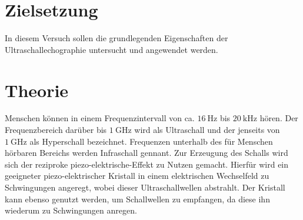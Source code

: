 \section{Zielsetzung}
\label{sec:Zielsetzung}

In diesem Versuch sollen die grundlegenden Eigenschaften der Ultraschallechographie untersucht und angewendet werden.

\section{Theorie}
\label{sec:Theorie}
Menschen können in einem Frequenzintervall von ca. $\SI{16}{\hertz}$ bis $\SI{20}{\kilo\hertz}$ hören. Der Frequenzbereich darüber bis $\SI{1}{\giga\hertz}$ wird als
Ultraschall und der jenseits von $\SI{1}{\giga\hertz}$ als Hyperschall bezeichnet. Frequenzen unterhalb des für Menschen hörbaren Bereichs werden Infraschall gennant.
\newline
Zur Erzeugung des Schalls wird sich der reziproke piezo-elektrische-Effekt zu Nutzen gemacht. Hierfür wird ein geeigneter piezo-elektrischer Kristall in einem
elektrischen Wechselfeld zu Schwingungen angeregt, wobei dieser Ultraschallwellen abstrahlt. Der Kristall kann ebenso genutzt werden, um Schallwellen zu empfangen,
da diese ihn wiederum zu Schwingungen anregen.\\
\\

